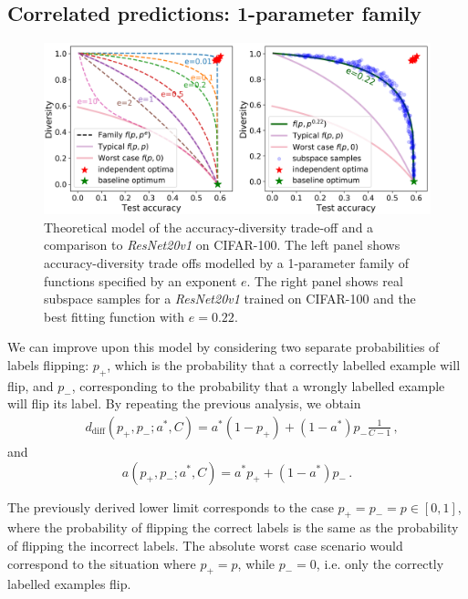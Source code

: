 \documentclass{article}
\newcommand{\reducespaceafterfigure}{\vspace{-1em}} %
\begin{document}
\subsection{Correlated predictions: 1-parameter family}
%
\begin{figure}[ht]%
	\centering%
	\includegraphics[width=1.0\linewidth]{figures/theoretical_curves_tight.png}
	\reducespaceafterfigure
	\caption{Theoretical model of the accuracy-diversity trade-off and a comparison to \emph{ResNet20v1} on CIFAR-100. The left panel shows accuracy-diversity trade offs modelled by a 1-parameter family of functions specified by an exponent $e$. The right panel shows real subspace samples for a \emph{ResNet20v1} trained on CIFAR-100 and the best fitting function with $e=0.22$.}
	\label{fig:diversity_accuracy_family}
\end{figure}%
%
We can improve upon this model by considering two separate probabilities of labels flipping: $p_\mathrm{+}$, which is the probability that a correctly labelled example will flip, and $p_\mathrm{-}$, corresponding to the probability that a wrongly labelled example will flip its label. By repeating the previous analysis, we obtain
 \begin{align}
 &d_{\mathrm{diff}}(p_\mathrm{+},p_\mathrm{-}; a^*, C) %
 = a^* (1-p_\mathrm{+}) + (1-a^*) p_\mathrm{-} \frac{1}{C-1} \, , 
 \end{align}
and
 \begin{equation}
 a(p_\mathrm{+},p_\mathrm{-}; a^*, C) = a^* p_\mathrm{+} + (1-a^*) p_\mathrm{-} \, .
 \end{equation}
 
The previously derived lower limit corresponds to the case $p_\mathrm{+} = p_\mathrm{-} = p \in [0,1]$, where the probability of flipping the correct labels is the same as the probability of flipping the incorrect labels. The absolute worst case scenario would correspond to the situation where $p_\mathrm{+}=p$, while $p_\mathrm{-} = 0$, i.e. only the correctly labelled examples flip.
\end{document}
